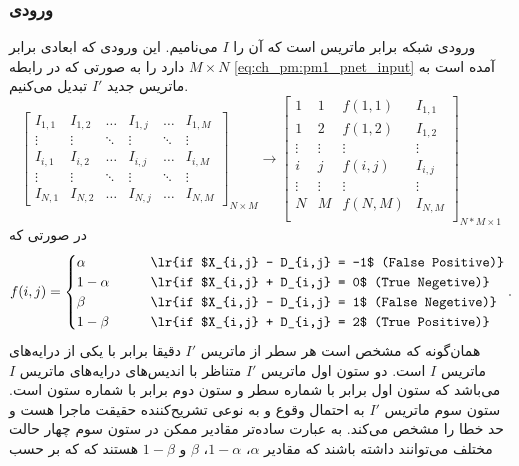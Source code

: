 \subsubsection{ورودی}
ورودی شبکه برابر ماتریس  است که آن را $I$ می‌نامیم. این ورودی که ابعادی برابر $M\times N$ دارد را به صورتی که در رابطه \ref{eq:ch_pm:pm1_pnet_input} آمده است به ماتریس جدید $I'$ تبدیل می‌کنیم. 
\begin{equation*}
	\begin{bmatrix}
		I_{1,1}  & I_{1,2} & \ldots   & I_{1,j}   & \ldots & I_{1,M}\\
		\vdots & \vdots & \ddots & \vdots & \ddots & \vdots \\
		I_{i,1}  & I_{i,2} & \ldots   & I_{i,j}   & \ldots & I_{i,M}\\
		\vdots & \vdots & \ddots & \vdots & \ddots & \vdots \\
		I_{N,1}  & I_{N,2} & \ldots   & I_{N,j}   & \ldots & I_{N,M}
	\end{bmatrix}_{N\times M}
	\rightarrow 
	 \begin{bmatrix}
	 	1          & 1         & f(1,1) & I_{1,1} \\
	 	1          & 2         & f(1,2) & I_{1,2} \\
	 	\vdots & \vdots & \vdots   & \vdots \\
	 	i          & j           & f(i,j)  & I_{i,j} \\
	 	\vdots & \vdots & \vdots   & \vdots \\
	 	N          & M         & f(N,M) & I_{N,M}\\
	 \end{bmatrix}_{N*M\times 1}
 	\label{eq:ch_pm:pm1_pnet_input}
\end{equation*}
در صورتی که
\begin{equation}
	f(i,j) = 
	\begin{cases}
		\alpha 	   \qquad & \text{\lr{if $X_{i,j} - D_{i,j} = -1$ (False Positive)}} \\
		1-\alpha  \qquad & \text{\lr{if $X_{i,j} + D_{i,j} = 0$ (True Negetive)}} \\
		\beta 		\qquad & \text{\lr{if $X_{i,j} - D_{i,j} =  1$ (False Negetive)}} \\
		1-\beta    \qquad & \text{\lr{if $X_{i,j} + D_{i,j} = 2$ (True Positive)}} 
	\end{cases}.
\end{equation}
همان‌گونه که مشخص است هر سطر از ماتریس $I'$ دقیقا برابر با یکی از درایه‌های ماتریس $I$ است. دو ستون اول ماتریس $I'$ متناظر با اندیس‌های درایه‌های ماتریس $I$ می‌باشد که ستون اول برابر با شماره سطر و ستون دوم برابر با شماره ستون است. ستون سوم ماتریس $I'$ به احتمال وقوع و به نوعی تشریح‌کننده حقیقت ماجرا هست و حد خطا را مشخص می‌کند. به عبارت ساده‌تر مقادیر ممکن در ستون سوم چهار حالت مختلف می‌توانند داشته باشند که مقادیر $\alpha$، $1-\alpha$، $\beta$ و $1-\beta$ هستند که که بر حسب
